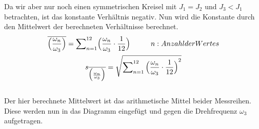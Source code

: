 Da wir aber nur noch einen symmetrischen Kreisel mit $J_1 = J_2$ und $J_3<J_1$ betrachten, ist das konstante Verh\"altnis  negativ. Nun wird die Konstante durch den Mittelwert der berechneten Verh\"altnisse berechnet.
\begin{gather}   
    \overline{\Bigl(\frac{\omega_n}{\omega_3}\Bigr)} = \sum\nolimits_{n=1}^{12}\Bigl(\frac{\omega_n}{\omega_3}\cdot{\frac{1}{12}}\Bigr) \tab n: Anzahl der Wertes \\[0.3mm]
    s_{\overline{\Bigl(\frac{\omega_n}{\omega_3}\Bigr)}} = \sqrt{\sum\nolimits_{n=1}^{12}{\Bigl(\frac{\omega_n}{\omega_3}\cdot{\frac{1}{12}\Bigr)}^2}}
\end{gather} \\
Der hier berechnete Mittelwert ist das arithmetische Mittel beider Messreihen. Diese werden nun in das Diagramm eingef\"ugt und gegen die Drehfrequenz $\omega_3$ aufgetragen. 